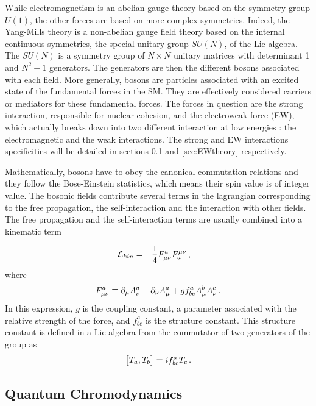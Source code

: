 While electromagnetism is an abelian gauge theory based on the symmetry group $U(1)$, the other forces are based on more complex symmetries. Indeed, the Yang-Mills theory \cite{PhysRev.96.191} is a non-abelian gauge field theory based on the internal continuous symmetries, the special unitary group $SU(N)$, of the Lie algebra. The $SU(N)$ is a symmetry group of $N \times N$ unitary matrices with determinant 1 and $N^2 -1$ generators. The generators are then the different bosons associated with each field.
More generally, bosons are particles associated with an excited state of the fundamental forces in the SM. They are effectively considered carriers or mediators for these fundamental forces. The forces in question are the strong interaction, responsible for nuclear cohesion, and the electroweak force (EW), which actually breaks down into two different interaction at low energies : the electromagnetic and the weak interactions. The strong and EW interactions specificities will be detailed in sections \ref{sec:QCD} and \ref{sec:EWtheory} respectively. \newline

Mathematically, bosons have to obey the canonical commutation relations and they follow the Bose-Einstein statistics, which means their spin value is of integer value. The bosonic fields contribute several terms in the lagrangian corresponding to the free propagation, the self-interaction and the interaction with other fields. The free propagation and the self-interaction terms are usually combined into a kinematic term

\begin{equation}
    \Lagr_{kin} = -\frac{1}{4}F^{a}_{\mu\nu}F_{a}^{\mu\nu} \msep
\end{equation}
where
\begin{equation}
    F^{a}_{\mu\nu} \equiv \partial_{\mu}A_{\nu}^a - \partial_{\nu}A_{\mu}^a + g f_{bc}^a A_{\mu}^b A_{\nu}^c \mend
\end{equation}
In this expression, $g$ is the coupling constant, a parameter associated with the relative strength of the force, and $f_{bc}^a$ is the structure constant. This structure constant is defined in a Lie algebra from the commutator of two generators of the group as
\begin{equation}
    \big[ T_a , T_b \big] = i f_{bc}^a T_c \mend
    \label{eq:commut}
\end{equation}

\subsection{Quantum Chromodynamics}
\label{sec:QCD}

